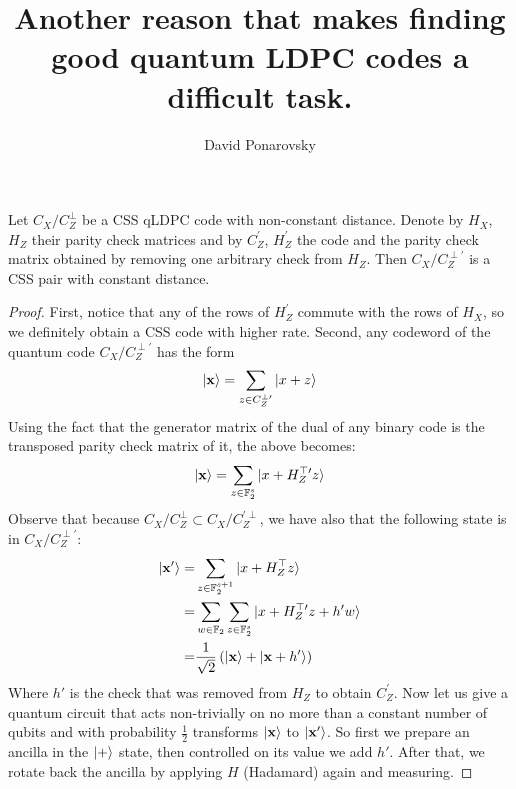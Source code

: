 \documentclass[manuscript,screen,review]{acmart}
\begin{document}


\title{Another reason that makes finding good quantum LDPC codes a difficult task.} 
\author{David Ponarovsky}
  \maketitle
  
  \begin{claim}
Let $C_X/C_Z^{\perp}$ be a CSS qLDPC code with non-constant distance. Denote by $H_X$, $H_Z$ their parity check matrices and by $C_Z^{\prime}$, $H_Z^{\prime}$ the code and the parity check matrix obtained by removing one arbitrary check from $H_Z$. Then $C_X/C_Z^{\perp \prime}$ is a CSS pair with constant distance.
\end{claim}

\begin{proof}
First, notice that any of the rows of $H_Z^{\prime}$ commute with the rows of $H_X$, so we definitely obtain a CSS code with higher rate. Second, any codeword of the quantum code $C_X/C_Z^{\perp \prime}$ has the form  
\begin{equation*}
  \begin{split}
    \ket{\mathbf{x}} = \sum_{z \in C_Z^{\perp \prime}}{\ket{x + z}}
  \end{split}
\end{equation*}
Using the fact that the generator matrix of the dual of any binary code is the transposed parity check matrix of it, the above becomes:
\begin{equation*}
  \begin{split}
    \ket{\mathbf{x}} = \sum_{z \in \mathbb{F}_2^s}{\ket{x + H_Z^{\top \prime}z}}
  \end{split}
\end{equation*}
Observe that because $C_X/C_Z^{\perp} \subset C_X/C_Z^{\prime \perp}$, we have also that the following state is in $C_X/C_Z^{\perp \prime}$:
\begin{equation*}
  \begin{split} 
    \ket{\mathbf{x'}} = & \sum_{z \in \mathbb{F}_2^{s+1}}{\ket{x + H_Z^{\top}z}} \\
    =& \sum_{w \in \mathbb{F}_2}\sum_{z \in \mathbb{F}_2^s}{\ket{x + H_Z^{\top \prime}z + h'w  }} \\ 
    =& \frac{1}{\sqrt{2}}\left( \ket{\mathbf{x}} + \ket{\mathbf{x} + h^{\prime}} \right)
  \end{split}
\end{equation*}
Where $h'$ is the check that was removed from $H_Z$ to obtain $C_Z^{\prime}$. Now let us give a quantum circuit that acts non-trivially on no more than a constant number of qubits and with probability $\frac{1}{2}$ transforms $\ket{\mathbf{x}}$ to $\ket{\mathbf{x'}}$. So first we prepare an ancilla in the $\ket{+}$ state, then controlled on its value we add $h'$. After that, we rotate back the ancilla by applying $H$ (Hadamard) again and measuring.


\end{proof}
\end{document}

